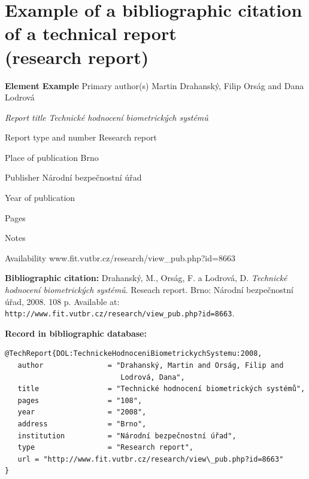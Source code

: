 \section*{Example of a bibliographic citation of a technical report \\ (research report)}
\label{pr-vyzkum}
\begin{tabbing}
\zarazky
\textbf{Element} \> \textbf{Example} \odradkovani
Primary author(s) \>
Martin {\sc Drahanský}, Filip {\sc Orság} and Dana {\sc Lodrová}

\odradkovani
{\em Report title} \>
{\em Technické hodnocení biometrických systémů}

\odradkovani
Report type and number \>
Research report

\odradkovani
Place of publication \>
Brno

\odradkovani
Publisher \>
Národní bezpečnostní úřad

\odradkovani
Year of publication 

\odradkovani
Pages\footnotemark[1] 

\odradkovani
Notes\footnotemark[2] \>

\odradkovani
Availability \>
www.{f}it.vutbr.cz/research/view\_pub.php?id=8663

\odradkovani
\end{tabbing}

\noindent \textbf{Bibliographic citation:} \odradkovani
{\sc Drahanský}, M., {\sc Orság}, F. a {\sc Lodrová}, D.
{\em Technické hodnocení biometrických systémů}. Reseach report. Brno: Národní bezpečnostní
úřad, 2008. 108 p.  Available at: \\
{\tt http://www.fit.vutbr.cz/research/view\_pub.php?id=8663}.

\bigskip \bigskip
\noindent \textbf{Record in bibliographic database:}
\vspace{-0.5em}
\begin{verbatim}
@TechReport{DOL:TechnickeHodnoceniBiometrickychSystemu:2008,
   author               = "Drahanský, Martin and Orság, Filip and
                           Lodrová, Dana",
   title                = "Technické hodnocení biometrických systémů",
   pages                = "108",
   year                 = "2008",
   address              = "Brno",
   institution          = "Národní bezpečnostní úřad",
   type                 = "Research report",
   url = "http://www.fit.vutbr.cz/research/view\_pub.php?id=8663"
}
\end{verbatim}


